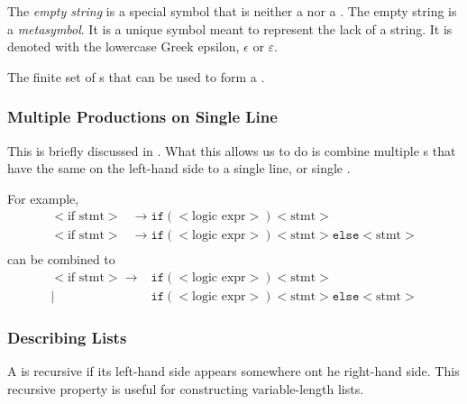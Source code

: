 \begin{definition}\label{def:Empty_String}
  The \emph{empty string} is a special symbol that is neither a  nor a .
  The empty string is a \emph{metasymbol}.
  It is a unique symbol meant to represent the lack of a string.
  It is denoted with the lowercase Greek epsilon, $\epsilon$ or $\varepsilon$.
\end{definition}

\begin{definition}[Alphabet]\label{def:Alphabet}
  The finite set of s that can be used to form a .
\end{definition}

\subsubsection{Multiple Productions on Single Line}\label{subsubsec:Multiple_Productions_One_Line}
This is briefly discussed in .
What this allows us to do is combine multiple s that have the same  on the left-hand side to a single line, or single .

For example,
\begin{equation}\label{eq:Multiple_Productions_Multiple_Lines}
  \begin{aligned}
    <\text{if stmt}> &\rightarrow \mathtt{if} ( <\text{logic expr}> ) <\text{stmt}> \\
    <\text{if stmt}> &\rightarrow \mathtt{if} ( <\text{logic expr}> ) <\text{stmt}> \mathtt{else} <\text{stmt}> \\
  \end{aligned}
\end{equation}
can be combined to
\begin{equation}\label{eq:Multiple_Productions_One_Line}
  \begin{aligned}
    <\text{if stmt}> \rightarrow &\mathtt{if} ( <\text{logic expr}> ) <\text{stmt}> \\
    \vert &\mathtt{if} ( <\text{logic expr}> ) <\text{stmt}> \mathtt{else} <\text{stmt}>
  \end{aligned}
\end{equation}

\subsubsection{Describing Lists}\label{subsubsec:Describing_Lists}
A  is recursive if its left-hand side  appears somewhere ont he right-hand side.
This recursive property is useful for constructing variable-length lists.

